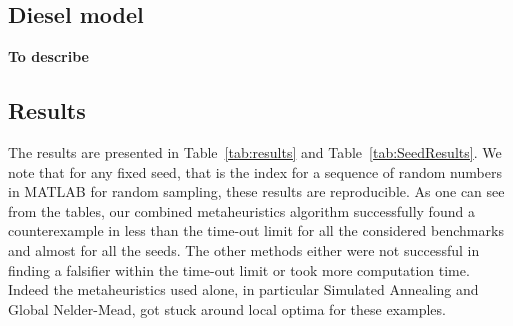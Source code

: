 




\subsection{Diesel model} \label{sec:diesel} {\bf To describe}

\subsection{Results} 
The results are presented in Table~\ref{tab:results} and Table~\ref{tab:SeedResults}.  We note that for
any fixed seed, that is the index for a sequence of random numbers in MATLAB for random sampling, these results are reproducible. 
As one can see from the tables, our combined metaheuristics algorithm successfully found a counterexample in
less than the time-out limit for all the considered benchmarks and almost for all the seeds. 
The other methods either were not successful in finding a falsifier within the time-out limit or 
took more computation time. Indeed the metaheuristics used alone, in particular Simulated Annealing 
and Global Nelder-Mead, got stuck around local optima for these examples.


